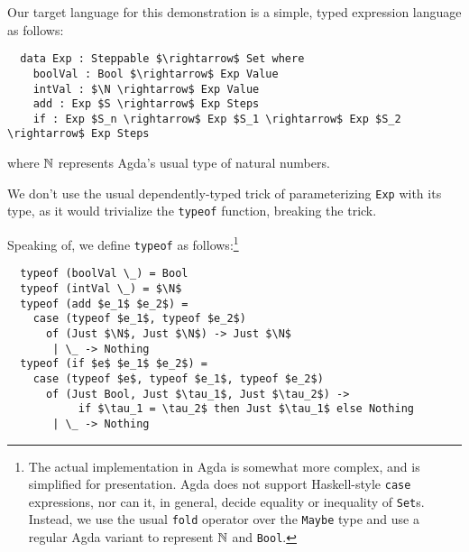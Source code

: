 \documentclass[manuscript,screen,review,sigplan]{acmart}
\begin{document}
Our target language for this demonstration is a simple, typed expression
language as follows:

\begin{lstlisting}
  data Exp : Steppable $\rightarrow$ Set where
    boolVal : Bool $\rightarrow$ Exp Value
    intVal : $\N \rightarrow$ Exp Value
    add : Exp $S \rightarrow$ Exp Steps
    if : Exp $S_n \rightarrow$ Exp $S_1 \rightarrow$ Exp $S_2 \rightarrow$ Exp Steps
\end{lstlisting}

where $\mathbb{N}$ represents Agda's usual type of natural numbers.

We don't use the usual dependently-typed trick of parameterizing
\texttt{Exp} with its type, as it would trivialize the \texttt{typeof}
function, breaking the trick.

Speaking of, we define \texttt{typeof} as follows:\footnote{The actual
implementation in Agda is somewhat more complex, and is simplified for
presentation. Agda does not support Haskell-style \texttt{case} expressions,
nor can it, in general, decide equality or inequality of \texttt{Set}s.
Instead, we use the usual \texttt{fold} operator over the \texttt{Maybe}
type and use a regular Agda variant to represent $\mathbb{N}$ and \texttt{Bool}.}

\begin{lstlisting}
  typeof (boolVal \_) = Bool
  typeof (intVal \_) = $\N$
  typeof (add $e_1$ $e_2$) =
    case (typeof $e_1$, typeof $e_2$)
      of (Just $\N$, Just $\N$) -> Just $\N$
       | \_ -> Nothing
  typeof (if $e$ $e_1$ $e_2$) =
    case (typeof $e$, typeof $e_1$, typeof $e_2$)
      of (Just Bool, Just $\tau_1$, Just $\tau_2$) ->
           if $\tau_1 = \tau_2$ then Just $\tau_1$ else Nothing
       | \_ -> Nothing
\end{lstlisting}



\end{document}
